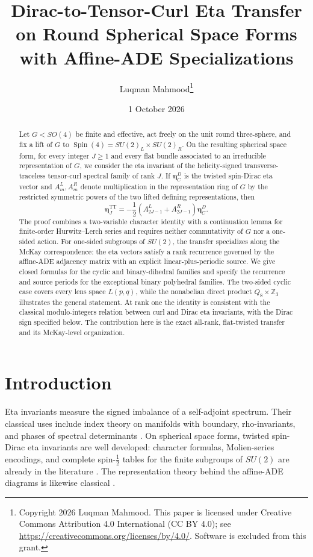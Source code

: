 \documentclass[11pt]{article}
\title{Dirac-to-Tensor-Curl Eta Transfer on Round Spherical Space Forms\\
with Affine-ADE Specializations}
\author{Luqman Mahmood\thanks{Copyright 2026 Luqman Mahmood. This paper is licensed under Creative Commons Attribution 4.0 International (CC BY 4.0); see \url{https://creativecommons.org/licenses/by/4.0/}. Software is excluded from this grant.}}
\date{1 October 2026}
\theoremstyle{definition}
\newcommand{\TT}{\mathrm{TT}}
\begin{document}
\maketitle

\begin{abstract}
Let $G<SO(4)$ be finite and effective, act freely on the unit round
three-sphere, and fix a lift of $G$ to
$\operatorname{Spin}(4)=SU(2)_L\times SU(2)_R$.  On the resulting spherical
space form, for every integer $J\geq1$ and every flat bundle associated to an
irreducible representation of $G$, we consider the eta invariant of the
helicity-signed transverse-traceless tensor-curl spectral family of rank $J$.
If $\boldsymbol\eta^D_C$ is the twisted spin-Dirac eta vector and
$A_m^L,A_m^R$ denote multiplication in the representation ring of $G$ by the
restricted symmetric powers of the two lifted defining representations, then
\[
 \boldsymbol\eta^{\TT}_J
 =-\frac12\left(A^L_{2J-1}+A^R_{2J-1}\right)
 \boldsymbol\eta^D_C.
\]
The proof combines a two-variable character identity with a continuation
lemma for finite-order Hurwitz--Lerch series and requires neither
commutativity of $G$ nor a one-sided action.  For one-sided subgroups of
$SU(2)$, the transfer specializes along the McKay correspondence: the eta
vectors satisfy a rank recurrence governed by the affine-ADE adjacency matrix
with an explicit linear-plus-periodic source.  We give closed formulas for
the cyclic and binary-dihedral families and specify the recurrence and source
periods for the exceptional binary polyhedral families.  The two-sided cyclic
case covers every lens space $L(p,q)$, while the nonabelian direct product
$Q_8\times\mathbb Z_3$ illustrates the general statement.  At rank one the
identity is consistent with the classical modulo-integers relation between
curl and Dirac eta invariants, with the Dirac sign specified below.  The contribution
here is the exact all-rank, flat-twisted transfer and its McKay-level
organization.
\end{abstract}

\section{Introduction}

Eta invariants measure the signed imbalance of a self-adjoint spectrum.
Their classical uses include index theory on manifolds with boundary,
rho-invariants, and phases of spectral determinants
\cite{APS1975,Donnelly1978,Gilkey1984}.  On spherical space forms, twisted
spin-Dirac eta invariants are well developed: character formulas,
Molien-series encodings, and complete spin-$\tfrac12$ tables for the finite
subgroups of $SU(2)$ are already in the literature
\cite{CisnerosMolina2001,Degeratu2009,Degeratu2001}.  The representation
theory behind the affine-ADE diagrams is likewise classical
\cite{McKay1980,Kostant1985,Rossmann2003}.
\end{document}
